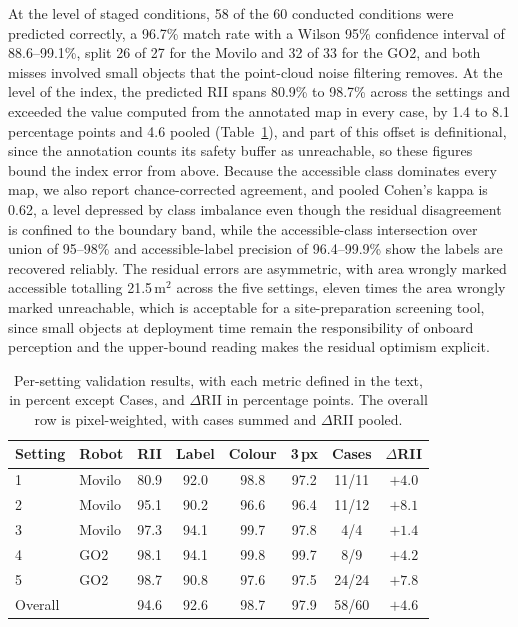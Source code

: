 \documentclass[a4paper, 10pt, conference]{ieeeconf}
\begin{document}
At the level of staged conditions, 58 of the 60 conducted conditions were predicted correctly, a 96.7\% match rate with a Wilson 95\% confidence interval of 88.6--99.1\%, split 26 of 27 for the Movilo and 32 of 33 for the GO2, and both misses involved small objects that the point-cloud noise filtering removes. At the level of the index, the predicted RII spans 80.9\% to 98.7\% across the settings and exceeded the value computed from the annotated map in every case, by 1.4 to 8.1 percentage points and 4.6 pooled (Table~\ref{tab:similarity}), and part of this offset is definitional, since the annotation counts its safety buffer as unreachable, so these figures bound the index error from above. Because the accessible class dominates every map, we also report chance-corrected agreement, and pooled Cohen's kappa is 0.62, a level depressed by class imbalance even though the residual disagreement is confined to the boundary band, while the accessible-class intersection over union of 95--98\% and accessible-label precision of 96.4--99.9\% show the labels are recovered reliably. The residual errors are asymmetric, with area wrongly marked accessible totalling 21.5\,m$^2$ across the five settings, eleven times the area wrongly marked unreachable, which is acceptable for a site-preparation screening tool, since small objects at deployment time remain the responsibility of onboard perception and the upper-bound reading makes the residual optimism explicit.

\begin{table}[t]
\caption{Per-setting validation results, with each metric defined in the text, in percent except Cases, and $\Delta$RII in percentage points. The overall row is pixel-weighted, with cases summed and $\Delta$RII pooled.}
\label{tab:similarity}
\centering
\footnotesize
\begin{tabular}{@{}llcccccc@{}}
\toprule
Setting & Robot & RII & Label & Colour & 3\,px & Cases & $\Delta$RII \\
\midrule
1 & Movilo & 80.9 & 92.0 & 98.8 & 97.2 & 11/11 & $+4.0$ \\
2 & Movilo & 95.1 & 90.2 & 96.6 & 96.4 & 11/12 & $+8.1$ \\
3 & Movilo & 97.3 & 94.1 & 99.7 & 97.8 & 4/4 & $+1.4$ \\
4 & GO2 & 98.1 & 94.1 & 99.8 & 99.7 & 8/9 & $+4.2$ \\
5 & GO2 & 98.7 & 90.8 & 97.6 & 97.5 & 24/24 & $+7.8$ \\
\midrule
Overall & & 94.6 & 92.6 & 98.7 & 97.9 & 58/60 & $+4.6$ \\
\bottomrule
\end{tabular}
\end{table}
\end{document}

